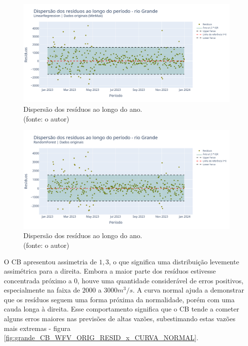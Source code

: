 \begin{figure}[!h]
	\centering
	\includegraphics[scale=0.33]{Figuras/rio_grande/wfv/LR/LR_WFV_ORIG_RESID_x_TEMPO.png}
	\caption{Dispersão dos resíduos ao longo do ano.\\(fonte: o autor)}
	\label{fig:grande_LR_WFV_ORIG_RESID_x_TEMPO}
\end{figure}

\begin{figure}[!h]
	\centering
	\includegraphics[scale=0.33]{Figuras/rio_grande/wfv/RF/RF_WFV_ORIG_RESID_x_TEMPO.png}
	\caption{Dispersão dos resíduos ao longo do ano.\\(fonte: o autor)}
	\label{fig:grande_RF_WFV_ORIG_RESID_x_TEMPO}
\end{figure}
\clearpage

O CB apresentou assimetria de $1,3$, o que significa uma distribuição levemente assimétrica para a direita. Embora a maior parte dos resíduos estivesse concentrada próximo a $0$, houve uma quantidade considerável de erros positivos, especialmente na faixa de $2000$ a $3000 m^3/s$. A curva normal ajuda a demonstrar que os resíduos seguem uma forma próxima da normalidade, porém com uma cauda longa à direita. Esse comportamento significa que o CB tende a cometer alguns erros maiores nas previsões de altas vazões, subestimando estas vazões mais extremas - figura \ref{fig:grande_CB_WFV_ORIG_RESID_x_CURVA_NORMAL}.

